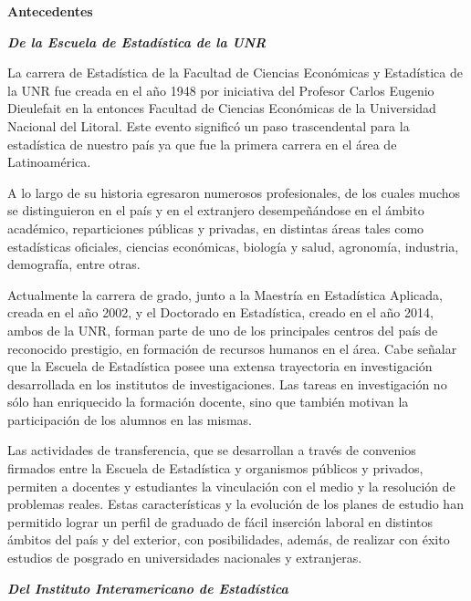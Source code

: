 \documentclass[12pt,a4paper]{article}
\begin{document}
\vspace*{1cm}
\centerline{\textbf{\LARGE{Antecedentes}}}
\vspace*{1cm}
{}


\bigbreak

\noindent \textbf{\textit{De la Escuela de Estadística de la UNR}}

La carrera de Estadística de la Facultad de Ciencias Económicas y Estadística de la UNR fue creada en el año 1948 por iniciativa del Profesor Carlos Eugenio Dieulefait en la entonces Facultad de Ciencias Económicas de la Universidad Nacional del Litoral. Este evento significó un paso trascendental para la estadística de nuestro país ya que  fue la primera carrera en el área de Latinoamérica.

A lo largo de su historia egresaron numerosos profesionales, de los cuales muchos se distinguieron en el país y en el extranjero desempeñándose en el ámbito académico, reparticiones públicas y privadas, en distintas áreas tales como  estadísticas oficiales, ciencias económicas, biología y salud, agronomía, industria, demografía, entre otras.

Actualmente la carrera de grado, junto a la Maestría en Estadística Aplicada, creada en el año 2002, y el Doctorado en Estadística, creado en el año 2014, ambos de la UNR, forman parte de uno de los principales centros del país de reconocido prestigio, en formación de recursos humanos en el área. 
Cabe señalar que la Escuela de Estadística posee una extensa trayectoria en investigación desarrollada en los institutos de investigaciones. Las tareas en investigación no sólo han enriquecido la formación docente, sino que también motivan la participación de los alumnos en las mismas. 

Las actividades de transferencia, que se desarrollan a través de convenios firmados entre la Escuela de Estadística y organismos públicos y privados, permiten a docentes y estudiantes la vinculación con el medio y la resolución de problemas reales.
Estas características y la evolución de los planes de estudio han permitido lograr un perfil de graduado de fácil inserción laboral en distintos ámbitos del país y del exterior, con posibilidades, además, de realizar con éxito estudios de posgrado en universidades nacionales y extranjeras.

\bigbreak
\noindent\textbf{\textit{Del Instituto Interamericano de Estadística}}
\end{document}
